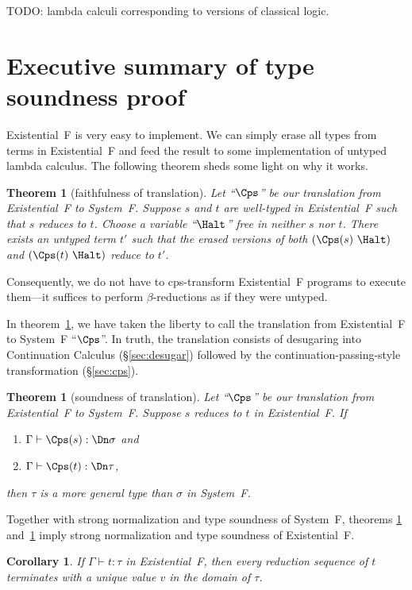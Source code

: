 \documentclass{amsart}
\newtheorem{theorem}[subsection]{Theorem}
\newtheorem{corollary}[subsection]{Corollary}
\begin{document}
TODO: lambda calculi corresponding to versions of classical
logic.


\section{Executive summary of type soundness proof}
\label{sec:exe}

Existential~F is very easy to implement. We can simply erase all
types from terms in Existential~F and feed the result to some
implementation of untyped lambda calculus. The following theorem
sheds some light on why it works.

\begin{theorem}
[faithfulness of translation]
\label{thm:faith}
Let ``$\Cps$'' be our translation from Existential~F to System~F.
Suppose $s$ and $t$ are well-typed in Existential~F such that $s$
reduces to $t$. Choose a variable ``$\Halt$'' free in neither $s$
nor $t$. There exists an untyped term $t'$ such that the erased
versions of both $(\Cps(s)~\Halt)$ and $(\Cps(t)~\Halt)$ reduce
to $t'$.
\end{theorem}

Consequently, we do not have to cps-transform Existential~F
programs to execute them---it suffices to perform
$\beta$-reductions as if they were untyped.

In theorem~\ref{thm:faith}, we have taken the liberty to
call the translation from Existential~F to System~F ``$\Cps$''.
In truth, the translation consists of desugaring into
Continuation Calculus (\S\ref{sec:desugar}) followed by
the continuation-passing-style transformation (\S\ref{sec:cps}).

\begin{theorem}
[soundness of translation]
\label{thm:sound}
Let ``$\Cps$'' be our translation from Existential~F to System~F.
Suppose $s$ reduces to $t$ in Existential~F. If
\begin{enumerate}
\item $\Gamma\vdash\Cps(s):\Dn\sigma$ and\/
\item $\Gamma\vdash\Cps(t):\Dn\tau$,
\end{enumerate}
then $\tau$ is a more general type than $\sigma$ in System~F.
\end{theorem}

Together with strong normalization and type soundness of
System~F, theorems \ref{thm:faith} and~\ref{thm:sound} imply
strong normalization and type soundness of Existential~F.

\begin{corollary}
\label{cor:sound}
If\/ $\Gamma\vdash t:\tau$ in Existential~F, then every reduction
sequence of $t$ terminates with a unique value $v$ in the domain
of $\tau$.
\end{corollary}
\end{document}
